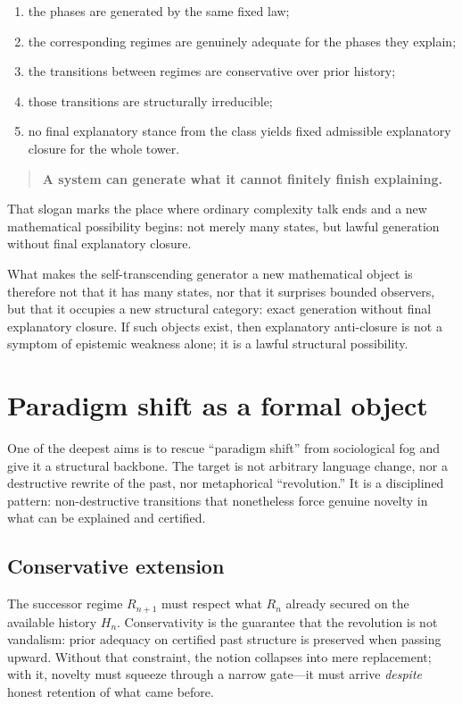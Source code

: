 \documentclass[11pt,a4paper]{article}
\theoremstyle{definition}
\begin{document}
\begin{enumerate}[leftmargin=2em]
\item the phases are generated by the same fixed law;
\item the corresponding regimes are genuinely adequate for the phases they explain;
\item the transitions between regimes are conservative over prior history;
\item those transitions are structurally irreducible;
\item no final explanatory stance from the class yields fixed admissible explanatory closure for the whole tower.
\end{enumerate}

\begin{quote}
\textbf{A system can generate what it cannot finitely finish explaining.}
\end{quote}

That slogan marks the place where ordinary complexity talk ends and a new mathematical possibility begins: not merely many states, but lawful generation without final explanatory closure.

What makes the self-transcending generator a new mathematical object is therefore not that it has many states, nor that it surprises bounded observers, but that it occupies a new structural category: exact generation without final explanatory closure. If such objects exist, then explanatory anti-closure is not a symptom of epistemic weakness alone; it is a lawful structural possibility.

\section{Paradigm shift as a formal object}\label{sec:paradigm-shift}

One of the deepest aims is to rescue ``paradigm shift'' from sociological fog and give it a structural backbone. The target is not arbitrary language change, nor a destructive rewrite of the past, nor metaphorical ``revolution.'' It is a disciplined pattern: non-destructive transitions that nonetheless force genuine novelty in what can be explained and certified.

\subsection{Conservative extension}

The successor regime $R_{n+1}$ must respect what $R_n$ already secured on the available history $H_n$. Conservativity is the guarantee that the revolution is not vandalism: prior adequacy on certified past structure is preserved when passing upward. Without that constraint, the notion collapses into mere replacement; with it, novelty must squeeze through a narrow gate---it must arrive \emph{despite} honest retention of what came before.
\end{document}
